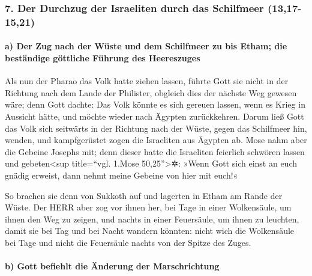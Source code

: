 \hypertarget{der-durchzug-der-israeliten-durch-das-schilfmeer-1317-1521}{%
\subsubsection{7. Der Durchzug der Israeliten durch das Schilfmeer
(13,17-15,21)}\label{der-durchzug-der-israeliten-durch-das-schilfmeer-1317-1521}}

\hypertarget{a-der-zug-nach-der-wuxfcste-und-dem-schilfmeer-zu-bis-etham-die-bestuxe4ndige-guxf6ttliche-fuxfchrung-des-heereszuges}{%
\paragraph{a) Der Zug nach der Wüste und dem Schilfmeer zu bis Etham;
die beständige göttliche Führung des
Heereszuges}\label{a-der-zug-nach-der-wuxfcste-und-dem-schilfmeer-zu-bis-etham-die-bestuxe4ndige-guxf6ttliche-fuxfchrung-des-heereszuges}}

 Als nun der Pharao das Volk hatte ziehen lassen, führte
Gott sie nicht in der Richtung nach dem Lande der Philister, obgleich
dies der nächste Weg gewesen wäre; denn Gott dachte: Das Volk könnte es
sich gereuen lassen, wenn es Krieg in Aussicht hätte, und möchte wieder
nach Ägypten zurückkehren.  Darum ließ Gott das Volk sich
seitwärts in der Richtung nach der Wüste, gegen das Schilfmeer hin,
wenden, und kampfgerüstet zogen die Israeliten aus Ägypten ab.
 Mose nahm aber die Gebeine Josephs mit; denn dieser
hatte die Israeliten feierlich schwören lassen und gebeten\textless sup
title=``vgl. 1.Mose 50,25''\textgreater✲: »Wenn Gott sich einst an euch
gnädig erweist, dann nehmt meine Gebeine von hier mit euch!«

 So brachen sie denn von Sukkoth auf und lagerten in
Etham am Rande der Wüste.  Der HERR aber zog vor ihnen
her, bei Tage in einer Wolkensäule, um ihnen den Weg zu zeigen, und
nachts in einer Feuersäule, um ihnen zu leuchten, damit sie bei Tag und
bei Nacht wandern könnten:  nicht wich die Wolkensäule
bei Tage und nicht die Feuersäule nachts von der Spitze des Zuges.

\hypertarget{b-gott-befiehlt-die-uxe4nderung-der-marschrichtung}{%
\paragraph{b) Gott befiehlt die Änderung der
Marschrichtung}\label{b-gott-befiehlt-die-uxe4nderung-der-marschrichtung}}

